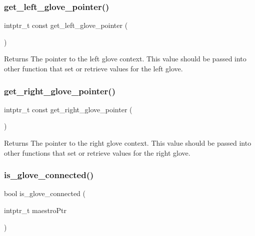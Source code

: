 \subsubsection{\texorpdfstring{get\+\_\+left\+\_\+glove\+\_\+pointer()}{get\_left\_glove\_pointer()}}
{\footnotesize\ttfamily intptr\+\_\+t const get\+\_\+left\+\_\+glove\+\_\+pointer (\begin{DoxyParamCaption}{ }\end{DoxyParamCaption})}

\begin{DoxyReturn}{Returns}
The pointer to the left glove context. This value should be passed into other function that set or retrieve values for the left glove. 
\end{DoxyReturn}
\mbox{\label{group__glove_context_access_ga9b8fd9d91aeac3f8da50f7a7eba0c32b}} 
\subsubsection{\texorpdfstring{get\+\_\+right\+\_\+glove\+\_\+pointer()}{get\_right\_glove\_pointer()}}
{\footnotesize\ttfamily intptr\+\_\+t const get\+\_\+right\+\_\+glove\+\_\+pointer (\begin{DoxyParamCaption}{ }\end{DoxyParamCaption})}

\begin{DoxyReturn}{Returns}
The pointer to the right glove context. This value should be passed into other functions that set or retrieve values for the right glove. 
\end{DoxyReturn}
\mbox{\label{group__glove_context_access_ga85666868951331c5266df7559abeefbc}} 
\subsubsection{\texorpdfstring{is\+\_\+glove\+\_\+connected()}{is\_glove\_connected()}}
{\footnotesize\ttfamily bool is\+\_\+glove\+\_\+connected (\begin{DoxyParamCaption}\item[{intptr\+\_\+t}]{maestro\+Ptr }\end{DoxyParamCaption})}


